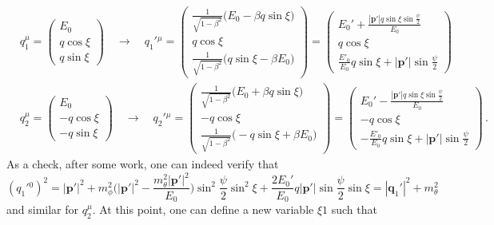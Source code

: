 \documentclass{article}
\numberwithin{equation}{subsection}
\begin{document}
\begin{equation}\begin{split}
	&q_1^\mu = \begin{pmatrix}
		E_0 \\
		q\cos\xi \\
		q\sin\xi
	\end{pmatrix}\quad \to \quad
	{q_1'}{}^\mu = \begin{pmatrix}
		\frac{1}{\sqrt{1 - \beta^2}}\big(E_0 - \beta q \sin\xi\big) \\
		q\cos\xi\\
		\frac{1}{\sqrt{1 - \beta^2}}\big(q\sin\xi - \beta E_0\big)
	\end{pmatrix} = 
	\begin{pmatrix}
		E_0' + \frac{|\mathbf{p}'|q\sin\xi\sin\frac{\psi}{2}}{E_0} \\
		q\cos\xi \\
		\frac{E'_0}{E_0}q\sin\xi + |\mathbf{p}'|\sin\frac{\psi}{2}
	\end{pmatrix} \\[0.5em]
	&q_2^\mu = \begin{pmatrix}
		E_0 \\
		-q\cos\xi \\
		-q\sin\xi
	\end{pmatrix}\quad \to \quad
	{q_2'}{}^\mu = \begin{pmatrix}
		\frac{1}{\sqrt{1 - \beta^2}}\big(E_0 + \beta q \sin\xi\big) \\
		- q\cos\xi\\
		\frac{1}{\sqrt{1 - \beta^2}}\big(- q\sin\xi + \beta E_0\big)
	\end{pmatrix} = 
	\begin{pmatrix}
		E_0' - \frac{|\mathbf{p}'|q\sin\xi\sin\frac{\psi}{2}}{E_0} \\
		- q\cos\xi \\
		- \frac{E'_0}{E_0}q\sin\xi + |\mathbf{p}'|\sin\frac{\psi}{2}
	\end{pmatrix}\,.
\end{split}\end{equation}
As a check, after some work, one can indeed verify that
\begin{equation}
	({q_1'}{}^0)^2 = |\mathbf{p}'|^2 + m_\phi^2 \Big(|\mathbf{p}'|^2 - \frac{m_\theta^2 |\mathbf{p}'|^2}{E_0}\Big)\sin^2\frac{\psi}{2}\sin^2\xi
		+ \frac{2E_0'}{E_0} q |\mathbf{p}'|\sin\frac{\psi}{2}\sin\xi = |\mathbf{q}_1'|^2 + m_\theta^2
\end{equation}
and similar for $q_2^\mu$. At this point, one can define a new variable $\xi1$ such that
\end{document}
